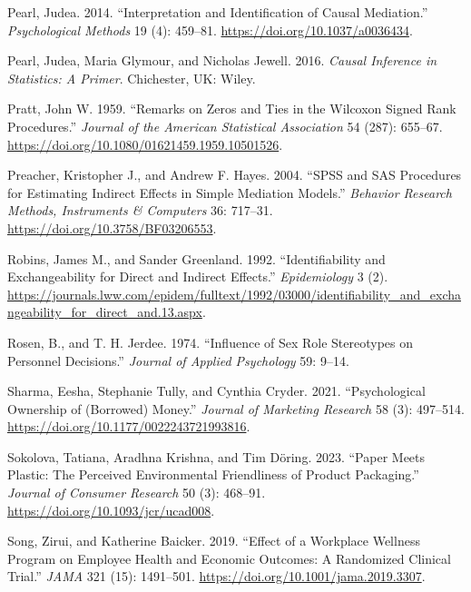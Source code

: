 \documentclass[
  11pt,
  letterpaper,
]{scrbook}
\newlength{\cslhangindent}
\newenvironment{CSLReferences}[2] %
 {\begin{list}{}{%
  \setlength{\itemindent}{0pt}
  \setlength{\leftmargin}{0pt}
  \setlength{\parsep}{0pt}
  \ifodd #1
   \setlength{\leftmargin}{\cslhangindent}
   \setlength{\itemindent}{-1\cslhangindent}
  \fi
  \setlength{\itemsep}{#2\baselineskip}}}
 {\end{list}}
\theoremstyle{definition}
\theoremstyle{definition}
\theoremstyle{remark}
\begin{document}
\begin{CSLReferences}{1}{0}
Pearl, Judea. 2014. {``Interpretation and Identification of Causal
Mediation.''} \emph{Psychological Methods} 19 (4): 459--81.
\url{https://doi.org/10.1037/a0036434}.

Pearl, Judea, Maria Glymour, and Nicholas Jewell. 2016. \emph{Causal
Inference in Statistics: A Primer}. Chichester, UK: Wiley.

Pratt, John W. 1959. {``Remarks on Zeros and Ties in the {W}ilcoxon
Signed Rank Procedures.''} \emph{Journal of the American Statistical
Association} 54 (287): 655--67.
\url{https://doi.org/10.1080/01621459.1959.10501526}.

Preacher, Kristopher J., and Andrew F. Hayes. 2004. {``{SPSS} and {SAS}
Procedures for Estimating Indirect Effects in Simple Mediation
Models.''} \emph{Behavior Research Methods, Instruments {\&} Computers}
36: 717--31. \url{https://doi.org/10.3758/BF03206553}.

Robins, James M., and Sander Greenland. 1992. {``Identifiability and
Exchangeability for Direct and Indirect Effects.''} \emph{Epidemiology}
3 (2).
\url{https://journals.lww.com/epidem/fulltext/1992/03000/identifiability_and_exchangeability_for_direct_and.13.aspx}.

Rosen, B., and T. H. Jerdee. 1974. {``Influence of Sex Role Stereotypes
on Personnel Decisions.''} \emph{Journal of Applied Psychology} 59:
9--14.

Sharma, Eesha, Stephanie Tully, and Cynthia Cryder. 2021.
{``Psychological Ownership of (Borrowed) Money.''} \emph{Journal of
Marketing Research} 58 (3): 497--514.
\url{https://doi.org/10.1177/0022243721993816}.

Sokolova, Tatiana, Aradhna Krishna, and Tim Döring. 2023. {``Paper Meets
Plastic: The Perceived Environmental Friendliness of Product
Packaging.''} \emph{Journal of Consumer Research} 50 (3): 468--91.
\url{https://doi.org/10.1093/jcr/ucad008}.

Song, Zirui, and Katherine Baicker. 2019. {``Effect of a Workplace
Wellness Program on Employee Health and Economic Outcomes: A Randomized
Clinical Trial.''} \emph{JAMA} 321 (15): 1491--501.
\url{https://doi.org/10.1001/jama.2019.3307}.


\end{CSLReferences}
\end{document}
